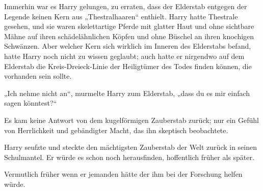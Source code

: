 Immerhin war es Harry gelungen, zu erraten, dass der Elderstab entgegen der Legende keinen Kern aus „Thestralhaaren“ enthielt. Harry hatte Thestrale gesehen, und sie waren skelettartige Pferde mit glatter Haut und ohne sichtbare Mähne auf ihren schädelähnlichen Köpfen und ohne Büschel an ihren knochigen Schwänzen. Aber welcher Kern sich wirklich im Inneren des Elderstabs befand, hatte Harry noch nicht zu wissen geglaubt; auch hatte er nirgendwo auf dem Elderstab die Kreis-Dreieck-Linie der Heiligtümer des Todes finden können, die vorhanden sein sollte.

„Ich nehme nicht an“, murmelte Harry zum Elderstab, „dass du es mir einfach sagen könntest?“

Es kam keine Antwort von dem kugelförmigen Zauberstab zurück; nur ein Gefühl von Herrlichkeit und gebändigter Macht, das ihn skeptisch beobachtete.

Harry seufzte und steckte den mächtigsten Zauberstab der Welt zurück in seinen Schulmantel. Er würde es schon noch herausfinden, hoffentlich früher als später.

Vermutlich früher wenn er jemanden hätte der ihm bei der Forschung helfen würde.

